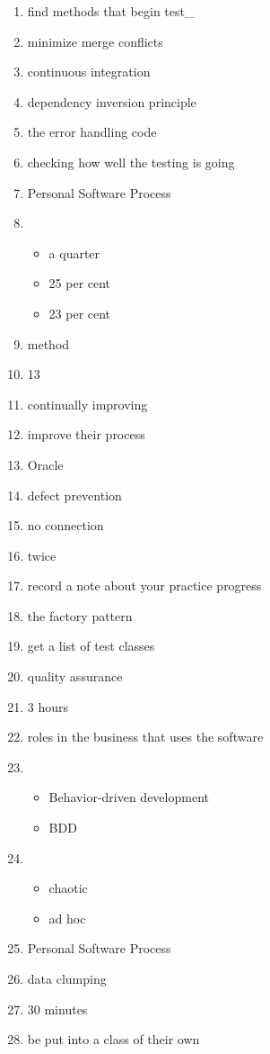 \documentclass{exam}
\begin{document}
\begin{enumerate}
\item find methods that begin test\_
\item minimize merge conflicts
\item continuous integration
\item dependency inversion principle
\item the error handling code
\item checking how well the testing is going
\item Personal Software Process
\item \begin{itemize}
\item a quarter
\item 25 per cent
\item 23 per cent
\end{itemize}
\item method
\item 13
\item continually improving
\item improve their process
\item Oracle
\item defect prevention
\item no connection
\item twice
\item record a note about your practice progress
\item the factory pattern
\item get a list of test classes
\item quality assurance
\item 3 hours
\item roles in the business that uses the software
\item \begin{itemize}
\item Behavior-driven development
\item BDD
\end{itemize}
\item \begin{itemize}
\item chaotic
\item ad hoc
\end{itemize}
\item Personal Software Process
\item data clumping
\item 30 minutes
\item be put into a class of their own

\end{enumerate}
\end{document}

